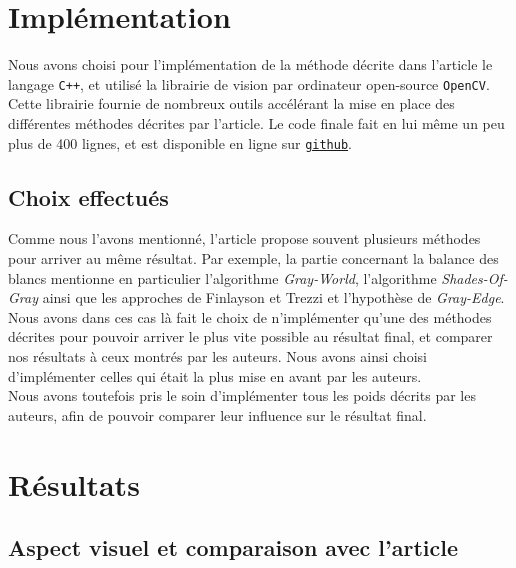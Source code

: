 \documentclass[twoside]{article}
\begin{document}
\section{Implémentation}
Nous avons choisi pour l'implémentation de la méthode décrite dans l'article le langage \texttt{C++}, et utilisé la librairie de vision par ordinateur open-source \texttt{OpenCV}. Cette librairie fournie de nombreux outils accélérant la mise en place des différentes méthodes décrites par l'article. Le code finale fait en lui même un peu plus de 400 lignes, et est disponible en ligne sur \texttt{\href{http://github.com/jcaille/Submarine}{github}}.

\subsection{Choix effectués}
Comme nous l'avons mentionné, l'article propose souvent plusieurs méthodes pour arriver au même résultat. Par exemple, la partie concernant la balance des blancs mentionne en particulier l'algorithme \emph{Gray-World}, l'algorithme \emph{Shades-Of-Gray} ainsi que les approches de Finlayson et Trezzi et l'hypothèse de \emph{Gray-Edge}. Nous avons dans ces cas là fait le choix de n'implémenter qu'une des méthodes décrites pour pouvoir arriver le plus vite possible au résultat final, et comparer nos résultats à ceux montrés par les auteurs. Nous avons ainsi choisi d'implémenter celles qui était la plus mise en avant par les auteurs.\\
Nous avons toutefois pris le soin d'implémenter tous les poids décrits par les auteurs, afin de pouvoir comparer leur influence sur le résultat final.

\section{Résultats}
\subsection{Aspect visuel et comparaison avec l'article}
\end{document}
